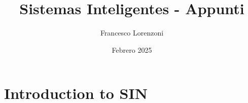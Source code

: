 


\title{Sistemas Inteligentes - Appunti}
\author{Francesco Lorenzoni}
\date{Febrero 2025}


\makeatletter
\renewcommand{\l@section}{\@dottedtocline{1}{1.5em}{2.6em}}
\renewcommand{\l@subsection}{\@dottedtocline{2}{2.5em}{3.6em}}
\renewcommand{\l@subsubsection}{\@dottedtocline{3}{3.5em}{4.5em}}
\makeatother
{} %



\doparttoc[n]

\maketitle
\tableofcontents

\part{Introduction to SIN}
\parttoc






